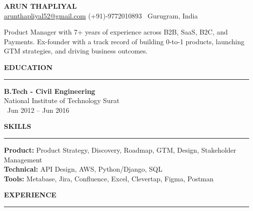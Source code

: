 \documentclass[a4paper,10pt]{article}
\begin{document}
\begin{center}
    \textbf{\LARGE \MakeUppercase{Arun Thapliyal}} \\
    \vspace{1mm}
    \href{mailto:arunthapliyal52@gmail.com}{arunthapliyal52@gmail.com} \hspace{5mm}
    \href{https://www.linkedin.com/in/arun-thapliyal-b82a7787/}{\faLinkedin} \hspace{5mm}
    (+91)-9772010893 \hspace{5mm} \faMapMarker \, Gurugram, India
\end{center}

\vspace{1mm}

{\large
Product Manager with 7+ years of experience across B2B, SaaS, B2C, and Payments. Ex-founder with a track record of building 0-to-1 products, launching GTM strategies, and driving business outcomes.
}

\vspace{1mm}

\begin{multicols}{2}

\textbf{\LARGE \MakeUppercase{Education}} \\
\rule{\columnwidth}{0.8pt}
\textbf{B.Tech - Civil Engineering} \\
National Institute of Technology Surat \\
\faCalendar \, Jun 2012 -- Jun 2016

\columnbreak

\textbf{\LARGE \MakeUppercase{Skills}} \\
\rule{\columnwidth}{0.8pt}
\textbf{Product:} Product Strategy, Discovery, Roadmap, GTM, Design, Stakeholder Management \\
\textbf{Technical:} API Design, AWS, Python/Django, SQL \\
\textbf{Tools:} Metabase, Jira, Confluence, Excel, Clevertap, Figma, Postman

\end{multicols}

\vspace{1mm}

\textbf{\LARGE \MakeUppercase{Experience}} \\
\rule{\textwidth}{0.8pt}
\end{document}
